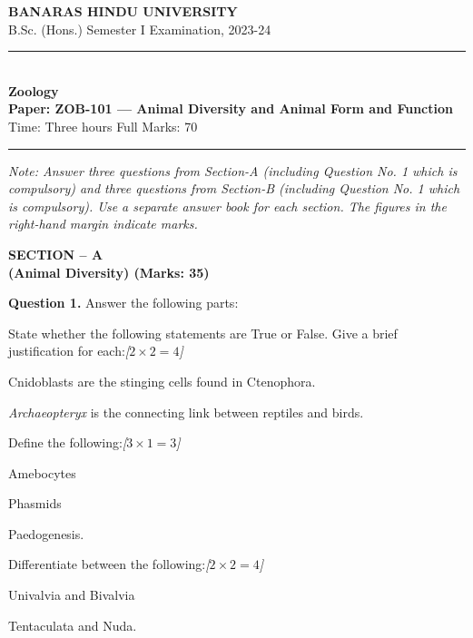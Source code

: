 \documentclass[11pt,a4paper]{article}
\newcommand{\pts}[1]{\hfill   \textit{[#1]}}
\begin{document}
\begin{center}
  {\large\bfseries BANARAS HINDU UNIVERSITY}\\[2pt]
  {\normalsize B.Sc. (Hons.) Semester I Examination, 2023-24}\\[6pt]
  \rule{0.8\linewidth}{0.5pt}\\[6pt]
  {\large\bfseries Zoology}\\[4pt]
  {\large\bfseries Paper: ZOB-101 --- Animal Diversity and Animal Form and Function}\\[4pt]
  {\normalsize Time: Three hours \hfill Full Marks: 70}
\end{center}

\rule{\linewidth}{0.4pt}

\smallskip



\noindent   \textit{Note: Answer three questions from Section-A (including Question No. 1 which is compulsory) and three questions from Section-B (including Question No. 1 which is compulsory). Use a separate answer book for each section. The figures in the right-hand margin indicate marks.}

\bigskip

\begin{center}
   \textbf{SECTION -- A} \\
   \textbf{(Animal Diversity) (Marks: 35)}
\end{center}




\noindent   \textbf{Question 1.} Answer the following parts:

\begin{parts}
  \item State whether the following statements are True or False. Give a brief justification for each:\pts{$2  \times 2 = 4$}
  
\begin{parts}
    \item Cnidoblasts are the stinging cells found in Ctenophora.
    \item   \textit{Archaeopteryx} is the connecting link between reptiles and birds.
  \end{parts}
  
  \item Define the following:\pts{$3  \times 1 = 3$}
  
\begin{parts}
    \item Amebocytes
    \item Phasmids
    \item Paedogenesis.
  \end{parts}
  
  \item Differentiate between the following:\pts{$2  \times 2 = 4$}
  
\begin{parts}
    \item Univalvia and Bivalvia
    \item Tentaculata and Nuda.
  \end{parts}
\end{parts}
\end{document}
